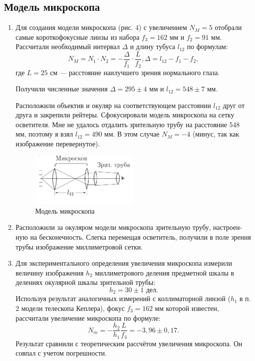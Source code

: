 \documentclass[a4paper, 12pt]{article}%
\begin{document}
	\subsection*{Модель микроскопа}
	\begin{enumerate}
		\item Для создания модели микроскопа (рис. 4) с увеличением $N_M = 5$ отобрали
		самые короткофокусные линзы из набора $f_3 = 162$ мм и $f_2=91$ мм. Рассчитали необходимый интервал $\Delta$ и длину тубуса $l_{12}$ по формулам:
		\begin{equation*}
		N_M = N_1\cdot N_2 = -\dfrac{\Delta}{f_1}\cdot\dfrac{L}{f_2},
		\Delta=l_{12}-f_1-f_2,
		\end{equation*}
		где $L = 25$ см --- расстояние наилучшего зрения нормального глаза.
		
		Получили численные значения $\Delta = 295 \pm 4$ мм и $l_{12} = 548 \pm 7$ мм.
		
		Расположили объектив и окуляр на соответствующем расстоянии $l_{12}$ друг от друга и закрепили рейтеры. Сфокусировали модель микроскопа на сетку осветителя. Мне не удалось отдалить зрительную трубу на расстояние 548 мм, поэтому я взял $l_{12} = 490$ мм. В этом случае $N_M = -4$ (минус, так как изображение перевернутое).
		
		\begin{figure}
			\begin{center}
				\includegraphics[width = 0.5\textwidth]{images/412-4.png}
				\caption{Модель микроскопа}
			\end{center}
		\end{figure}
		
		\item Расположили за окуляром модели микроскопа зрительную трубу, настроен-
		ную на бесконечность. Слегка перемещая осветитель, получили в поле зрения
		трубы изображение миллиметровой сетки. 
		
		\item Для экспериментального определения увеличения микроскопа измерили величину изображения $h_2$ миллиметрового деления предметной шкалы в делениях окулярной шкалы зрительной трубы:
		\begin{equation*}
		h_2 = 30\pm1\text{ дел}.
		\end{equation*}
		Используя результат аналогичных измерений с коллиматорной линзой ($h_1$ в п. 2 модели телескопа Кеплера), фокус $f_3 = 162$ мм которой известен, рассчитали увеличение микроскопа по формуле:
		\begin{equation*}
		N_m = -\dfrac{h_2}{h_1}\dfrac{L}{f_3} = -3,96 \pm 0,17.
		\end{equation*}
		Результат сравнили с теоретическим рассчётом увеличения микроскопа. Он совпал с учетом погрешности.
	\end{enumerate}
\end{document}
